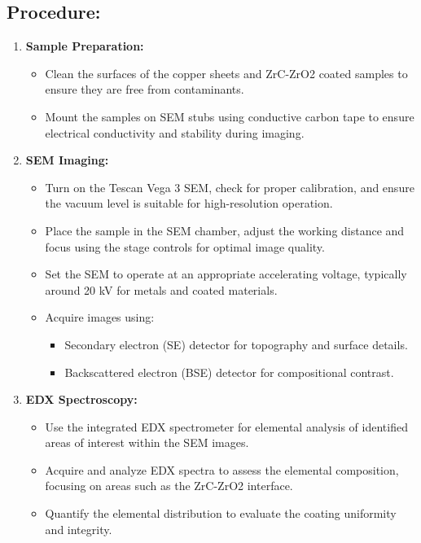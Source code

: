 \documentclass[11pt]{article}
\begin{document}
		\subsection*{Procedure:}
		\begin{enumerate}
			\item \textbf{Sample Preparation:}
			\begin{itemize}
				\item Clean the surfaces of the copper sheets and ZrC-ZrO2 coated samples to ensure they are free from contaminants.
				\item Mount the samples on SEM stubs using conductive carbon tape to ensure electrical conductivity and stability during imaging.
			\end{itemize}
			
			\item \textbf{SEM Imaging:}
			\begin{itemize}
				\item Turn on the Tescan Vega 3 SEM, check for proper calibration, and ensure the vacuum level is suitable for high-resolution operation.
				\item Place the sample in the SEM chamber, adjust the working distance and focus using the stage controls for optimal image quality.
				\item Set the SEM to operate at an appropriate accelerating voltage, typically around 20 kV for metals and coated materials.
				\item Acquire images using:
				\begin{itemize}
					\item Secondary electron (SE) detector for topography and surface details.
					\item Backscattered electron (BSE) detector for compositional contrast.
				\end{itemize}
			\end{itemize}
			
			\item \textbf{EDX Spectroscopy:}
			\begin{itemize}
				\item Use the integrated EDX spectrometer for elemental analysis of identified areas of interest within the SEM images.
				\item Acquire and analyze EDX spectra to assess the elemental composition, focusing on areas such as the ZrC-ZrO2 interface.
				\item Quantify the elemental distribution to evaluate the coating uniformity and integrity.
			\end{itemize}
			

\end{enumerate}
\end{document}
